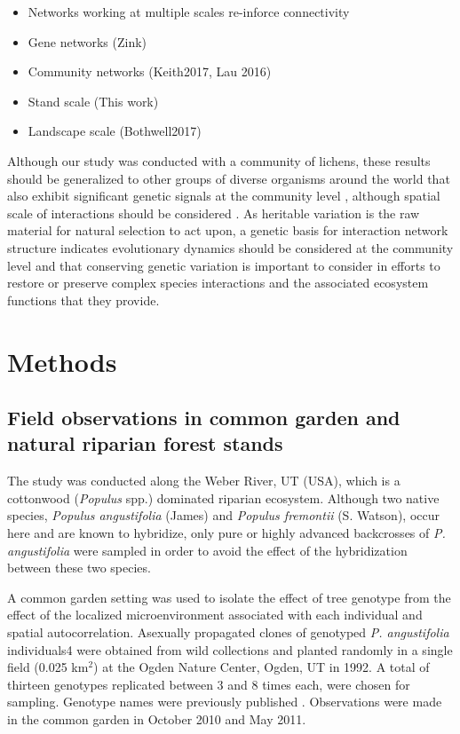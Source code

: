 \documentclass[fleqn,10pt]{wlscirep}
\begin{document}
\begin{itemize}
\item Networks working at multiple scales re-inforce connectivity
\item Gene networks (Zink)
\item Community networks (Keith2017, Lau 2016)
\item Stand scale (This work)
\item Landscape scale (Bothwell2017)
\end{itemize}

Although our study was conducted with a community of
lichens, these results should be generalized to other groups of
diverse organisms around the world that also exhibit significant
genetic signals at the community level \cite{Rowntree2011,
  Whitham2012}, although spatial scale of interactions should be
considered \cite{Zook2010}. As heritable variation is the raw material
for natural selection to act upon, a genetic basis for interaction
network structure indicates evolutionary dynamics should be considered
at the community level and that conserving genetic variation is
important to consider in efforts to restore or preserve complex
species interactions and the associated ecosystem functions
\cite{Evans2013} that they provide.


\section*{Methods}

\subsection*{Field observations in common garden and natural riparian
  forest stands}

The study was conducted along the Weber River, UT (USA), which is a
cottonwood (\textit{Populus} spp.) dominated riparian
ecosystem. Although two native species, \textit{Populus angustifolia}
(James) and \textit{Populus fremontii} (S. Watson), occur here and are
known to hybridize, only pure or highly advanced backcrosses of
\textit{P. angustifolia} were sampled in order to avoid the effect of
the hybridization between these two species.



A common garden setting was used to isolate the effect of tree
genotype from the effect of the localized microenvironment associated
with each individual and spatial autocorrelation. Asexually propagated
clones of genotyped \textit{P. angustifolia} individuals4 were
obtained from wild collections and planted randomly in a single field
(0.025 km$^2$) at the Ogden Nature Center, Ogden, UT in 1992. A total
of thirteen genotypes replicated between 3 and 8 times each, were
chosen for sampling. Genotype names were previously published
\cite{Ellison2005}. Observations were made in the common garden in
October 2010 and May 2011.
\end{document}
